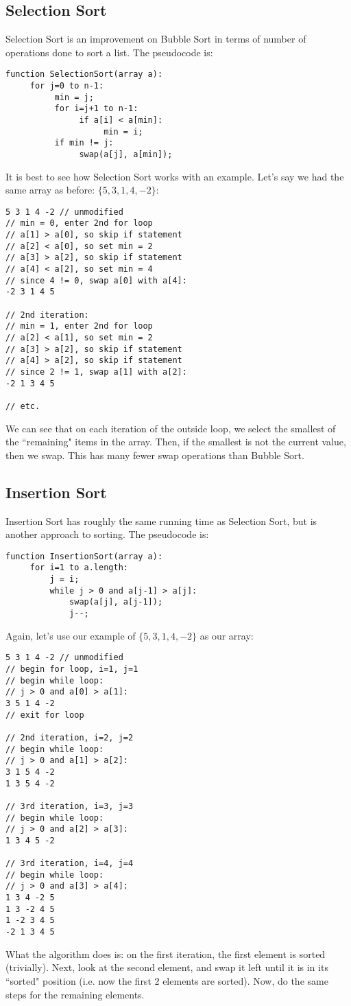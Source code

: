 \subsection{Selection Sort}
Selection Sort is an improvement on Bubble Sort in terms of number of operations done to sort a list. The pseudocode is:
\begin{verbatim}
function SelectionSort(array a):
     for j=0 to n-1:
          min = j;
          for i=j+1 to n-1:
               if a[i] < a[min]:
                    min = i;
          if min != j:
               swap(a[j], a[min]);
\end{verbatim}
It is best to see how Selection Sort works with an example. Let's say we had the same array as before: $\{5, 3, 1, 4, -2\}$:
\begin{verbatim}
5 3 1 4 -2 // unmodified
// min = 0, enter 2nd for loop
// a[1] > a[0], so skip if statement
// a[2] < a[0], so set min = 2
// a[3] > a[2], so skip if statement
// a[4] < a[2], so set min = 4
// since 4 != 0, swap a[0] with a[4]:
-2 3 1 4 5

// 2nd iteration:
// min = 1, enter 2nd for loop
// a[2] < a[1], so set min = 2
// a[3] > a[2], so skip if statement
// a[4] > a[2], so skip if statement
// since 2 != 1, swap a[1] with a[2]:
-2 1 3 4 5

// etc.
\end{verbatim}
We can see that on each iteration of the outside loop, we select the smallest of the ``remaining" items in the array. Then, if the smallest is not the current value, then we swap. This has many fewer swap operations than Bubble Sort.

\subsection{Insertion Sort}
Insertion Sort has roughly the same running time as Selection Sort, but is another approach to sorting. The pseudocode is:
\begin{verbatim}
function InsertionSort(array a):
     for i=1 to a.length:
         j = i;
         while j > 0 and a[j-1] > a[j]:
             swap(a[j], a[j-1]);
             j--;
\end{verbatim}
Again, let's use our example of $\{5, 3, 1, 4, -2\}$ as our array:
\begin{verbatim}
5 3 1 4 -2 // unmodified
// begin for loop, i=1, j=1
// begin while loop:
// j > 0 and a[0] > a[1]:
3 5 1 4 -2
// exit for loop

// 2nd iteration, i=2, j=2
// begin while loop:
// j > 0 and a[1] > a[2]:
3 1 5 4 -2
1 3 5 4 -2

// 3rd iteration, i=3, j=3
// begin while loop:
// j > 0 and a[2] > a[3]:
1 3 4 5 -2

// 3rd iteration, i=4, j=4
// begin while loop:
// j > 0 and a[3] > a[4]:
1 3 4 -2 5
1 3 -2 4 5
1 -2 3 4 5
-2 1 3 4 5
\end{verbatim}
What the algorithm does is: on the first iteration, the first element is sorted (trivially). Next, look at the second element, and swap it left until it is in its ``sorted" position (i.e. now the first 2 elements are sorted). Now, do the same steps for the remaining elements.

